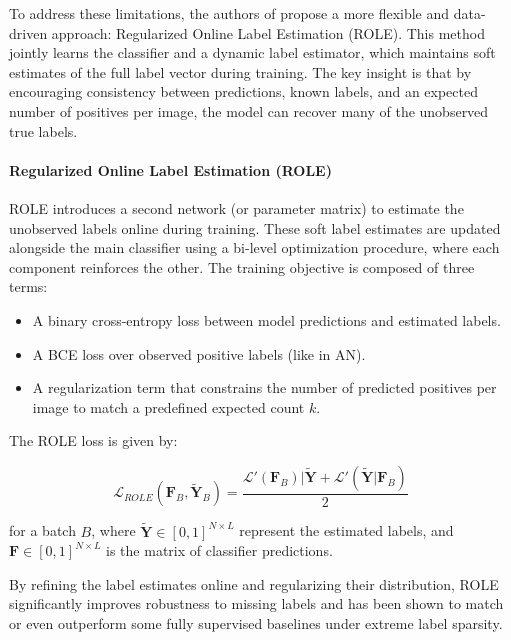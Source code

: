 \documentclass[lettersize,journal]{IEEEtran}
\begin{document}
To address these limitations, the authors of \cite{mlsp} propose a more flexible and data-driven approach: Regularized Online Label Estimation (ROLE). This method jointly learns the classifier and a dynamic label estimator, which maintains soft estimates of the full label vector during training. The key insight is that by encouraging consistency between predictions, known labels, and an expected number of positives per image, the model can recover many of the unobserved true labels.

\paragraph{Regularized Online Label Estimation (ROLE)}
ROLE introduces a second network (or parameter matrix) to estimate the unobserved labels online during training. These soft label estimates are updated alongside the main classifier using a bi-level optimization procedure, where each component reinforces the other. The training objective is composed of three terms:
\begin{itemize}
\item A binary cross-entropy loss between model predictions and estimated labels.
\item A BCE loss over observed positive labels (like in AN).
\item A regularization term that constrains the number of predicted positives per image to match a predefined expected count $k$.
\end{itemize}

The ROLE loss is given by:

\begin{equation}
    \mathcal{L}_{ROLE}(\mathbf{F}_B, \mathbf{\tilde{Y}}_B) = \frac{\mathcal{L}'(\mathbf{F}_B)|\mathbf{\tilde{Y}}+\mathcal{L}'(\mathbf{\tilde{Y}}|\mathbf{F}_B)}{2}
\end{equation}

\noindent for a batch $B$, where $\mathbf{\tilde{Y}}\in[0,1]^{N\times L}$ represent the estimated labels, and $\mathbf{F}\in[0,1]^{N\times L}$ is the matrix of classifier predictions.


By refining the label estimates online and regularizing their distribution, ROLE significantly improves robustness to missing labels and has been shown to match or even outperform some fully supervised baselines under extreme label sparsity.
\end{document}
